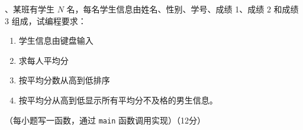 \documentclass[UTF8,a4paper,10.5pt]{ctexart}
\begin{document}
\medskip
{}、某班有学生 $N$ 名，每名学生信息由姓名、性别、学号、成绩 1、成绩 2 和成绩 3 组成，试编程要求：
\begin{enumerate}[label=（\arabic*）, leftmargin=2.4em, itemsep=2pt]
    \item 学生信息由键盘输入
    \item 求每人平均分
    \item 按平均分数从高到低排序
    \item 按平均分从高到低显示所有平均分不及格的男生信息。
\end{enumerate}
\noindent （每小题写一函数，通过 \texttt{main} 函数调用实现）（12分）
\end{document}
